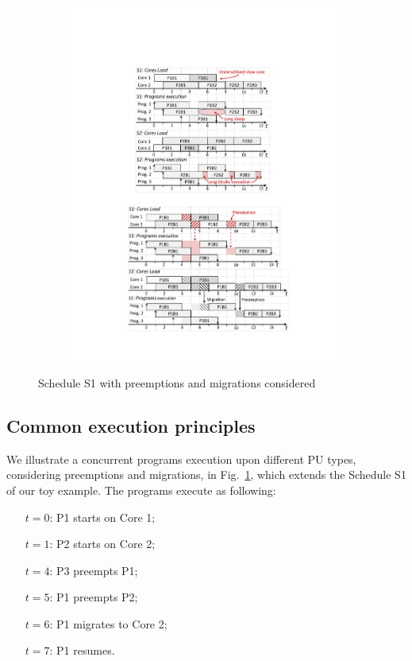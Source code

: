 \begin{figure}
\begin{minipage}{.75\columnwidth}%
\begin{subfigure}{1.105\linewidth}
\includegraphics[width=\linewidth]{figs/s1PreemptionMigration.pdf}
\end{subfigure}
\caption{Schedule S1 with preemptions and migrations considered}
\label{fig:s1PreemptionMigration}
\end{minipage}%
\quad
\end{figure}


\subsection*{\textbf{Common execution principles}}

We illustrate a concurrent programs execution upon different PU types, considering preemptions and migrations, in Fig.~\ref{fig:s1PreemptionMigration}, which extends the Schedule S1 of our toy example. The programs execute as following:
\begin{enumerate}
\itemindent=14pt
\item[$t=0$:] P1 starts on Core 1;
\item[$t=1$:] P2 starts on Core 2;
\item[$t=4$:] P3 preempts P1;
\item[$t=5$:] P1 preempts P2;
\item[$t=6$:] P1 migrates to Core 2;
\item[$t=7$:] P1 resumes.
\end{enumerate}

